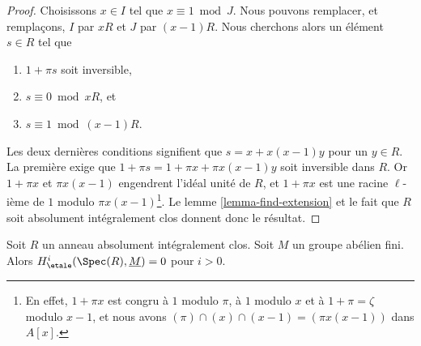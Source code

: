 \begin{proof}
Choisissons $x \in I$ tel que $x \equiv 1 \bmod J$.
Nous pouvons remplacer, et remplaçons, $I$ par $xR$ et $J$ par $(x - 1)R$.
Nous cherchons alors un élément $s \in R$ tel que
\begin{enumerate}
\item $1 + \pi s$ soit inversible,
\item $s \equiv 0 \bmod xR$, et
\item $s \equiv 1 \bmod (x - 1)R$.
\end{enumerate}
Les deux dernières conditions signifient que $s = x + x(x - 1)y$ pour un $y \in R$.
La première exige que $1 + \pi s = 1 + \pi x + \pi x (x - 1) y$
soit inversible dans $R$.
Or $1 + \pi x$ et $\pi x (x - 1)$ engendrent l'idéal
unité de $R$, et $1 + \pi x$ est une racine $\ell$-ième de $1$
modulo $\pi x (x - 1)$\footnote{En effet, $1 + \pi x$ est congru
à $1$ modulo $\pi$, à $1$ modulo $x$ et à
$1 + \pi = \zeta$ modulo $x - 1$, et nous avons
$(\pi) \cap (x) \cap (x - 1) = (\pi x (x - 1))$ dans $A[x]$.}.
Le lemme \ref{lemma-find-extension} et le fait que $R$ soit
absolument intégralement clos donnent donc le résultat.
\end{proof}

\begin{proposition}
\label{proposition-aic-vanishing}
Soit $R$ un anneau absolument intégralement clos.
Soit $M$ un groupe abélien fini.
Alors $H^i_\etale(\Spec(R), \underline{M}) = 0$ pour $i > 0$.
\end{proposition}

